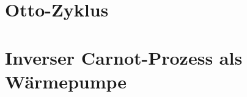 \subsection{}

\subsection{}

\section{Otto-Zyklus}

\section{Inverser Carnot-Prozess als Wärmepumpe}

\subsection{}

\subsection{}


